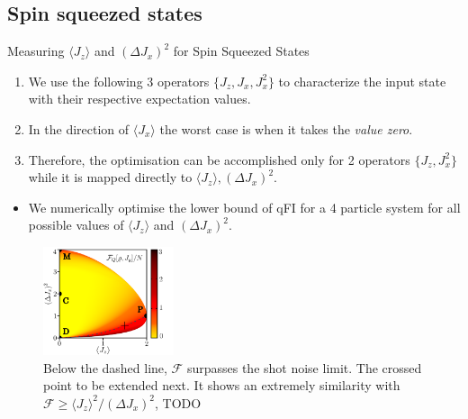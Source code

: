 \documentclass{beamer}
\newcommand{\expect}[1]{\ensuremath{\langle #1 \rangle}}
\newcommand{\varian}[1]{\ensuremath{\left(\Delta #1 \right)^2}}
\begin{document}
	\subsection{Spin squeezed states}

		\begin{frame}
			{Measuring $\expect{J_z}$ and $\varian{J_x}$ for Spin Squeezed States}

			\begin{enumerate}
				\item We use the following 3 operators $\{ J_z,J_x,J_x^2 \}$ to characterize the input state with their respective expectation values.
				\item In the direction of $\expect{J_x}$ the worst case is when it takes the \emph{\color{blue}value zero}.
				\item Therefore, the optimisation can be accomplished only for 2 operators $\{ J_z,J_x^2 \}$ while it is mapped directly to $\expect{J_z},\varian{J_x}$.

			\end{enumerate}

		\end{frame}

		\begin{frame}
			\begin{itemize}
				\item We numerically optimise the lower bound of qFI for a 4 particle system for all possible values of $\expect{J_z}$ and $\varian{J_x}$.
			\end{itemize}
			\begin{figure}
				\includegraphics[height=120px]{img/lb-spsq.pdf}
				\caption{Below the dashed line, $\mathcal{F}$ surpasses the shot noise limit. The crossed point to be extended next. It shows an extremely similarity with $\mathcal{F}\geq \expect{J_z}^2/\varian{J_x}$, TODO}
			\end{figure}

		\end{frame}
\end{document}
